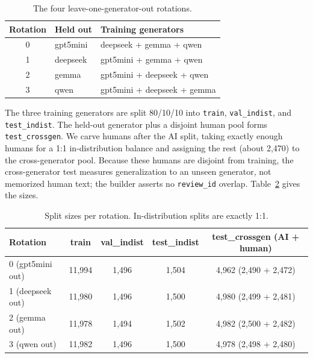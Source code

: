 \documentclass[manuscript,nonacm]{acmart}
\begin{document}
\begin{table}[H]
\centering
\caption{The four leave-one-generator-out rotations.}
\label{tab:rotations}
\begin{tabular}{cll}
\toprule
Rotation & Held out & Training generators \\
\midrule
0 & gpt5mini  & deepseek + gemma + qwen \\
1 & deepseek  & gpt5mini + gemma + qwen \\
2 & gemma     & gpt5mini + deepseek + qwen \\
3 & qwen      & gpt5mini + deepseek + gemma \\
\bottomrule
\end{tabular}
\end{table}

The three training generators are split 80/10/10 into \texttt{train},
\texttt{val\_indist}, and \texttt{test\_indist}. The held-out generator plus a
disjoint human pool forms \texttt{test\_crossgen}. We carve humans after the AI
split, taking exactly enough humans for a 1:1 in-distribution balance and
assigning the rest (about 2{,}470) to the cross-generator pool. Because these
humans are disjoint from training, the cross-generator test measures
generalization to an unseen generator, not memorized human text; the builder
asserts no \texttt{review\_id} overlap. Table~\ref{tab:splits} gives the sizes.

\begin{table}[H]
\centering
\caption{Split sizes per rotation. In-distribution splits are exactly 1:1.}
\label{tab:splits}
\begin{tabular}{lcccc}
\toprule
Rotation & train & val\_indist & test\_indist & test\_crossgen (AI + human) \\
\midrule
0 (gpt5mini out) & 11{,}994 & 1{,}496 & 1{,}504 & 4{,}962 (2{,}490 + 2{,}472) \\
1 (deepseek out) & 11{,}980 & 1{,}496 & 1{,}500 & 4{,}980 (2{,}499 + 2{,}481) \\
2 (gemma out)    & 11{,}978 & 1{,}494 & 1{,}502 & 4{,}982 (2{,}500 + 2{,}482) \\
3 (qwen out)     & 11{,}982 & 1{,}496 & 1{,}500 & 4{,}978 (2{,}498 + 2{,}480) \\
\bottomrule
\end{tabular}
\end{table}
\end{document}
